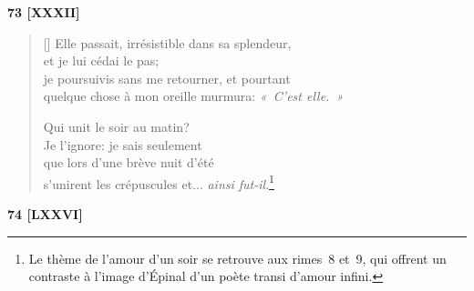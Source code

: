 \documentclass[a4paper,12pt]{book}
\begin{document}
\bigskip

\begin{center}
  \textbf{73 [XXXII]}
\end{center}

\settowidth{\versewidth}{je poursuivis sans me retourner, et pourtant}

\begin{verse}[\versewidth]
  Elle passait, irrésistible dans sa splendeur, \\
  et je lui cédai le pas; \\
  je poursuivis sans me retourner, et pourtant \\
  quelque chose à mon oreille murmura: \emph{«~C'est elle.~»}

  Qui unit le soir au matin? \\
  Je l'ignore: je sais seulement \\
  que lors d'une brève nuit d'été \\
  s'unirent les crépuscules et... \emph{ainsi fut-il}.\footnote{Le
  thème de l'amour d'un soir se retrouve aux rimes~8 et~9, qui offrent
  un contraste à l'image d'Épinal d'un poète transi d'amour infini.}
\end{verse}

\bigskip

\begin{center}
  \textbf{74 [LXXVI]}
\end{center}

\settowidth{\versewidth}{« Oh, quel amour sans paroles que celui de la mort!}
\end{document}
